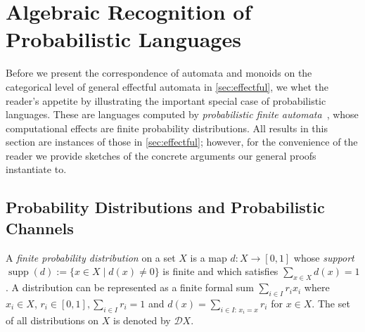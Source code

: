 \documentclass[a4paper, UKenglish, numberwithinsect, thm-restate, cleveref, final]{lipics-v2021}
\theoremstyle{plain}
\theoremstyle{definition}
\newcommand{\D}{\ensuremath{\mathcal{D}}}
\DeclareMathOperator{\supp}{supp}
\numberwithin{equation}{section}
\begin{document}
\section{Algebraic Recognition of Probabilistic Languages}
\label{sec:fpa}

Before we present the correspondence of automata and monoids on the categorical level of
general effectful automata in \cref{sec:effectful}, we whet the reader's appetite by illustrating the important special case of probabilistic languages. These are languages computed
by \emph{probabilistic finite automata}~\cite{Rabin63}, whose computational effects are
finite probability distributions.  All results in this section are instances of 
those in \cref{sec:effectful}; however, for the convenience of the reader we provide sketches
of the concrete arguments our general proofs instantiate to.



\subsection{Probability Distributions and Probabilistic Channels}\label{sec:dist-monad}
A \emph{finite probability distribution} on a set $X$ is a map $d\colon X\to [0,1]$ whose \emph{support} $\supp(d):=\{x\in X \mid d(x)\neq 0\}$ is finite and which satisfies $\sum_{x\in X}d(x) = 1$. A distribution can be represented as a finite formal sum $\sum_{i\in I} r_i x_i$ where $x_i\in X$, $r_i\in [0,1], \sum_{i \in I} r_{i} = 1$ and $d(x)=\sum_{i\in I:\, x_i=x} r_i$ for $x\in X$. The set of all distributions on $X$ is denoted by \(\D X\).
\end{document}
